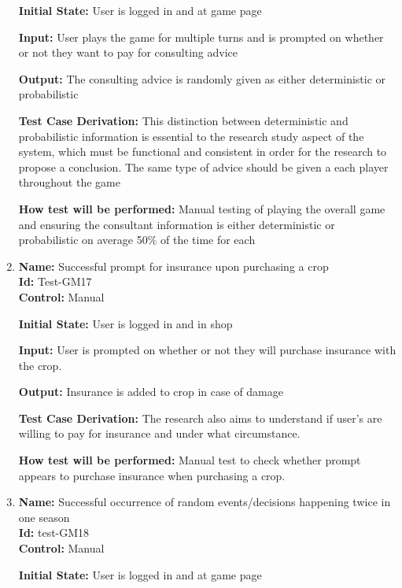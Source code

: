 \documentclass[12pt, titlepage]{article}
\begin{document}
\begin{enumerate}
\textbf{Initial State:} User is logged in and at game page
					
\textbf{Input:} User plays the game for multiple turns and is prompted on whether or not they want to pay for consulting advice
					
\textbf{Output:} The consulting advice is randomly given as either deterministic or probabilistic

\textbf{Test Case Derivation:} This distinction between deterministic and probabilistic information is essential to the research study aspect of the system, which must be functional and consistent in order for the research to propose a conclusion. The same type of advice should be given a each player throughout the game

\textbf{How test will be performed:} Manual testing of playing the overall game and ensuring the consultant information is either deterministic or probabilistic on average 50\% of the time for each

\item{\textbf{Name:} Successful prompt for insurance upon purchasing a crop\\} %
\textbf{Id:} Test-GM17 \label{Test-GM17}\\

\textbf{Control:} Manual 

\textbf{Initial State:} User is logged in and in shop

\textbf{Input:} User is prompted on whether or not they will purchase insurance with the crop.

\textbf{Output:} Insurance is added to crop in case of damage

\textbf{Test Case Derivation:} The research also aims to understand if user's are willing to pay for insurance and under what circumstance.

\textbf{How test will be performed:} Manual test to check whether prompt appears to purchase insurance when purchasing a crop.

\item{\textbf{Name:} Successful occurrence of random events/decisions happening twice in one season\\} %
\textbf{Id:} test-GM18 \label{Test-GM18}\\

\textbf{Control:} Manual
					
\textbf{Initial State: }User is logged in and at game page
					

\end{enumerate}
\end{document}
